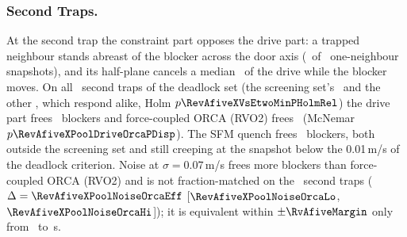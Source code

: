 \subsubsection{Second Traps.}
At the second trap the constraint part opposes the drive part: a trapped neighbour stands abreast of the blocker across the door axis (\CtwsixAbreastN\ of \CtwsixN\ one-neighbour snapshots), and its half-plane cancels a median \StHeldCancel\ of the drive while the blocker moves. On all \RevAfiveXPoolN\ second traps of the deadlock set (the screening set's \RevAfiveXEtwoN\ and the other \RevAfiveXNewN, which respond alike, Holm $p\RevAfiveXVsEtwoMinPHolmRel$) the drive part frees \RevAfiveXPoolDriveFreed\ blockers and force-coupled ORCA (RVO2) frees \RevAfiveXPoolOrcaFreed\ (McNemar $p\RevAfiveXPoolDriveOrcaPDisp$). The SFM quench frees \RevAfiveXPoolSFMFreed\ blockers, both outside the screening set and still creeping at the snapshot below the 0.01\,m/s of the deadlock criterion. Noise at $\sigma=0.07$\,m/s frees more blockers than force-coupled ORCA (RVO2) and is not fraction-matched on the \RevAfiveXPoolN\ second traps ($\Delta=\RevAfiveXPoolNoiseOrcaEff$ [$\RevAfiveXPoolNoiseOrcaLo$, $\RevAfiveXPoolNoiseOrcaHi$]); it is equivalent within $\pm\RvAfiveMargin$ only from \RvAfiveSecondPoolWinOtherOneFrom\ to \RvAfiveSecondPoolWinOtherOneTo\,s.

